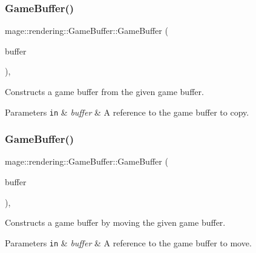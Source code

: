 \subsubsection{\texorpdfstring{Game\+Buffer()}{GameBuffer()}\hspace{0.1cm}{\footnotesize\ttfamily [2/3]}}
{\footnotesize\ttfamily mage\+::rendering\+::\+Game\+Buffer\+::\+Game\+Buffer (\begin{DoxyParamCaption}\item[{const \hyperlink{structmage_1_1rendering_1_1_game_buffer}{Game\+Buffer} \&}]{buffer }\end{DoxyParamCaption})\hspace{0.3cm}{\ttfamily [default]}, {\ttfamily [noexcept]}}

Constructs a game buffer from the given game buffer.


\begin{DoxyParams}[1]{Parameters}
\mbox{\tt in}  & {\em buffer} & A reference to the game buffer to copy. \\
\hline
\end{DoxyParams}
\hypertarget{structmage_1_1rendering_1_1_game_buffer_a4f151da7c4b17426f9293d72f3621583}{}\label{structmage_1_1rendering_1_1_game_buffer_a4f151da7c4b17426f9293d72f3621583} 
\subsubsection{\texorpdfstring{Game\+Buffer()}{GameBuffer()}\hspace{0.1cm}{\footnotesize\ttfamily [3/3]}}
{\footnotesize\ttfamily mage\+::rendering\+::\+Game\+Buffer\+::\+Game\+Buffer (\begin{DoxyParamCaption}\item[{\hyperlink{structmage_1_1rendering_1_1_game_buffer}{Game\+Buffer} \&\&}]{buffer }\end{DoxyParamCaption})\hspace{0.3cm}{\ttfamily [default]}, {\ttfamily [noexcept]}}

Constructs a game buffer by moving the given game buffer.


\begin{DoxyParams}[1]{Parameters}
\mbox{\tt in}  & {\em buffer} & A reference to the game buffer to move. \\
\hline
\end{DoxyParams}
\hypertarget{structmage_1_1rendering_1_1_game_buffer_a7cf8e2d277f99d447af729a6a92fe572}{}\label{structmage_1_1rendering_1_1_game_buffer_a7cf8e2d277f99d447af729a6a92fe572} 
